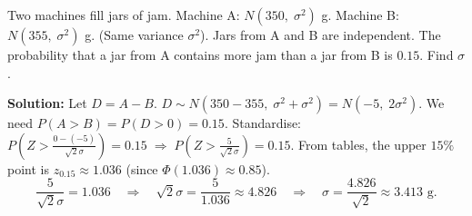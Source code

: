 \documentclass[11pt]{article}
\begin{document}
\begin{exemplebox}
Two machines fill jars of jam. Machine A: $N(350,\; \sigma^2)$ g. Machine B: $N(355,\; \sigma^2)$ g. (Same variance $\sigma^2$). Jars from A and B are independent. The probability that a jar from A contains more jam than a jar from B is $0.15$. Find $\sigma$.

\textbf{Solution:}
Let $D = A - B$. $D \sim N(350-355,\; \sigma^2 + \sigma^2) = N(-5,\; 2\sigma^2)$.
We need $P(A > B) = P(D > 0) = 0.15$.
Standardise: $P\left(Z > \frac{0 - (-5)}{\sqrt{2}\sigma}\right) = 0.15 \;\Rightarrow\; P\left(Z > \frac{5}{\sqrt{2}\sigma}\right) = 0.15$.
From tables, the upper $15\%$ point is $z_{0.15} \approx 1.036$ (since $\Phi(1.036) \approx 0.85$).
\[
\frac{5}{\sqrt{2}\sigma} = 1.036 \quad \Rightarrow \quad \sqrt{2}\sigma = \frac{5}{1.036} \approx 4.826 \quad \Rightarrow \quad \sigma = \frac{4.826}{\sqrt{2}} \approx 3.413 \text{ g}.
\]
\end{exemplebox}
\end{document}
